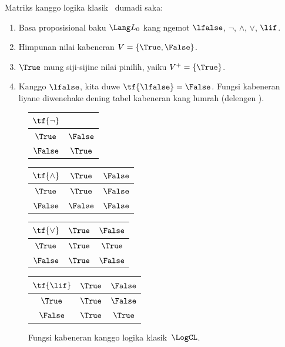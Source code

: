 \documentclass[../../../include/open-logic-section]{subfiles}
\begin{document}
\begin{ex}
Matriks kanggo logika klasik~\LogCL{} dumadi saka:
\begin{enumerate}
  \item Basa proposisional baku $\Lang L_0$ kang ngemot
  $\lfalse$, $\lnot$, $\land$, $\lor$, $\lif$.
  \item Himpunan nilai kabeneran $V = \{\True, \False\}$.
  \item $\True$ mung siji-sijine nilai pinilih, yaiku
  $V^+ = \{\True\}$.
  \item Kanggo $\lfalse$, kita duwe $\tf{\lfalse} = \False$.
  Fungsi kabeneran liyane diwenehake dening tabel kabeneran
  kang lumrah (delengen ).
\end{enumerate}
\begin{figure}
  \begin{center}
      \begin{tabular}{c|c} 
        $\tf{\lnot}$ & \\ 
        \hline  
        $\True$ & $\False$ \\ 
        $\False$ & $\True$ 
      \end{tabular}
      \quad
      \begin{tabular}{c|cc} 
        $\tf{\land}$ & $\True$ & $\False$ \\ 
        \hline 
        $\True$ & $\True$ & $\False$ \\ 
        $\False$ & $\False$ & $\False$ 
      \end{tabular}
      \quad
      \begin{tabular}{c|cc} 
        $\tf{\lor}$ & $\True$ & $\False$ \\ 
        \hline 
        $\True$ & $\True$ & $\True$ \\ 
        $\False$ & $\True$ & $\False$ 
      \end{tabular}
      \quad
      \begin{tabular}{c|cc} 
        $\tf{\lif}$ & $\True$ & $\False$ \\ 
        \hline 
        $\True$ & $\True$ & $\False$ \\ 
        $\False$ & $\True$ & $\True$ 
      \end{tabular}
    \end{center} 
    \caption{Fungsi kabeneran kanggo logika klasik~$\LogCL$.}
  \end{figure}
  \end{ex}
\end{document}
